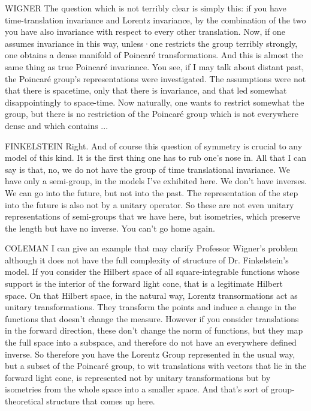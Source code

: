 WIGNER The question which is not terribly clear is simply this: if you have
time-translation invariance and Lorentz invariance, by the combination of the two
you have also invariance with respect to every other translation. Now, if one
assumes invariance in this way, unless·one restricts the group terribly strongly,
one obtains a dense manifold of Poincar\'e transformations. And this is almost
the same thing as true Poincar\'e invariance. You see, if I may talk about
distant past, the Poincar\'e group's representations were investigated. The
assumptions were not that there is space­time, only that there is invariance, and
that led somewhat disappointingly to space-time. Now naturally, one wants to
restrict somewhat the group, but there is no restriction of the Poincar\'e group
which is not everywhere dense and which contains ...

FINKELSTEIN Right. And of course this question of symmetry is crucial to any
model of this kind. It is the first thing one has to rub one's nose in. All that
I can say is that, no, we do not have the group of time translational invariance.
We have only a semi-group, in the models I've exhibited here. We don't have
inverses. We can go into the future, but not into the past. The representation of
the step into the future is also not by a unitary operator. So these are not even
unitary representations of semi-groups that we have here, but isometries, which
preserve the length but have no inverse. You can't go home again.

COLEMAN I can give an example that may clarify Professor Wigner's problem
although it does not have the full complexity of structure of Dr. Finkelstein's
model. If you consider the Hilbert space of all square-integrable functions whose
support is the interior of the forward light cone, that is a legitimate Hilbert
space. On that Hilbert space, in the natural way, Lorentz transormations act as
unitary transformations. They transform the points and induce a change in the
functions that doesn't change the measure. However if you consider translations
in the forward direction, these don't change the norm of functions, but they map
the full space into a subspace, and therefore do not have an everywhere defined
inverse. So therefore you have the Lorentz Group represented in the usual way,
but a subset of the Poincar\'e group, to wit translations with vectors that lie
in the forward light cone, is represented not by unitary transformations but by
isometries from the whole space into a smaller space. And that's sort of
group-theoretical structure that comes up here.

